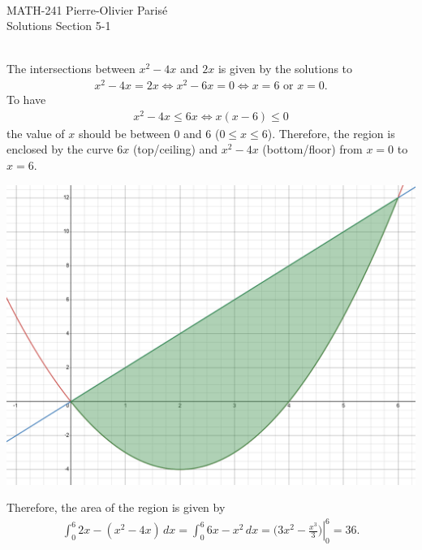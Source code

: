 


	\noindent \hrulefill \\
	MATH-241 \hfill Pierre-Olivier Paris{\'e}\\
	Solutions Section 5-1 \hfill \semester \\\vspace*{-1cm}
	
	\noindent\hrulefill
	
	\spc	
	
	\\
	The intersections between $x^2 - 4x$ and $2x$ is given by the solutions to
		\begin{align*}
		x^2 - 4x = 2x \iff x^2 - 6x = 0 \iff x = 6 \text{ or } x = 0 .
		\end{align*}
	To have
		\begin{align*}
		x^2 - 4x \leq 6x \iff x (x - 6) \leq 0
		\end{align*}
	the value of $x$ should be between $0$ and $6$ ($0 \leq x \leq 6$). Therefore, the region is enclosed by the curve $6x$ (top/ceiling) and $x^2 - 4x$ (bottom/floor) from $x = 0$ to $x = 6$.
		\begin{center}
		\includegraphics[scale=0.3]{fig1.png}
		\end{center}
		
	Therefore, the area of the region is given by
		\begin{align*}
		\int_0^6 2x - (x^2 - 4x) \, dx = \int_0^6 6x - x^2 \, dx = \left. \big( 3x^2 - \frac{x^3}{3} \big)\right|_0^6 = 36.
		\end{align*}
		
